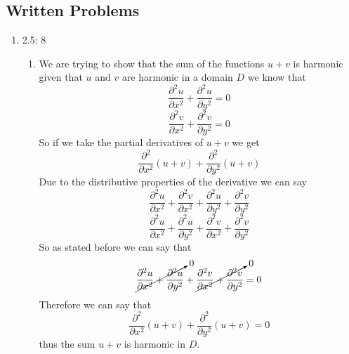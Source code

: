 \documentclass[11pt]{article}
\begin{document}

\subsection*{Written Problems}
\begin{enumerate}
\item 2.5: 8
\begin{enumerate}
\item We are trying to show that the sum of the functions $u+v$ is harmonic given that $u$ and $v$ are harmonic in a domain $D$ we know that
$$\frac{\partial^2 u}{\partial x^2} +\frac{\partial^2 u}{\partial y^2} =0$$
$$\frac{\partial^2 v}{\partial x^2} +\frac{\partial^2 v}{\partial y^2} =0$$
So if we take the partial derivatives of $u+v$ we get 
$$\frac{\partial^2}{\partial x^2}(u+v) +\frac{\partial^2}{\partial y^2}(u+v)$$
Due to the distributive properties of the derivative we can say
$$\frac{\partial^2u}{\partial x^2} + \frac{\partial^2v}{\partial x^2}+ \frac{\partial^2u}{\partial y^2}+\frac{\partial^2v}{\partial y^2}$$
$$\frac{\partial^2u}{\partial x^2} + \frac{\partial^2u}{\partial y^2}+\frac{\partial^2v}{\partial x^2}+ \frac{\partial^2v}{\partial y^2}$$
So as stated before we can say that
$$\cancelto{0}{\frac{\partial^2u}{\partial x^2} + \frac{\partial^2u}{\partial y^2}}+\cancelto{0}{\frac{\partial^2v}{\partial x^2}+ \frac{\partial^2v}{\partial y^2}} = 0$$
Therefore we can say that 
$$\frac{\partial^2}{\partial x^2}(u+v) +\frac{\partial^2}{\partial y^2}(u+v)=0$$
thus the sum $u+v$ is harmonic in $D$.


\end{enumerate}
\end{enumerate}
\end{document}

